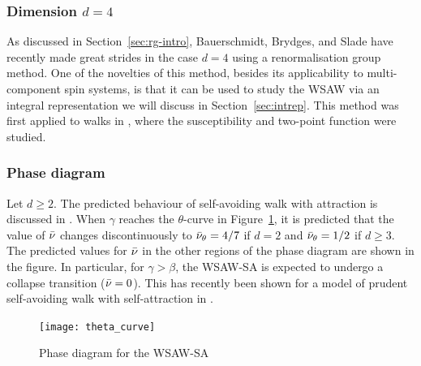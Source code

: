 \subsubsection{Dimension $d = 4$}

As discussed in Section~\ref{sec:rg-intro}, Bauerschmidt, Brydges, and Slade have
recently made great strides in the case $d = 4$  using
a  renormalisation group method.
One of the novelties of this method, besides its applicability to multi-component
spin systems, is that it can be used to study the WSAW via an integral representation
we will discuss in Section~\ref{sec:intrep}. This method was first applied to walks
in \cite{BBS-saw4-log,BBS-saw4}, where the susceptibility and two-point function were
studied.

\subsubsection{Phase diagram}

Let $d \ge 2$. The predicted behaviour of self-avoiding walk with attraction is discussed
in \cite{Vand98}.
When $\gamma$ reaches the $\theta$-curve in Figure~\ref{fig:theta-curve}, it is predicted
that the value of $\bar\nu$ changes discontinuously to $\bar\nu_\theta = 4/7$ if $d = 2$
and $\bar\nu_\theta = 1/2$ if $d \ge 3$. The predicted values for $\bar\nu$
in the other regions of the phase diagram are shown in the figure. In particular, for
$\gamma > \beta$, the WSAW-SA is expected to undergo a collapse transition ($\bar\nu = 0$).
This has recently been shown for a model of prudent self-avoiding walk with self-attraction
in \cite{PT16}.

\begin{figure}
\centering
\texttt{[image: theta\_curve]}
\caption[Phase diagram of WSAW-SA]{Phase diagram for the WSAW-SA}
\label{fig:theta-curve}
\end{figure}

